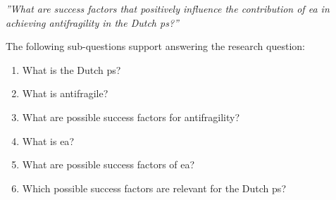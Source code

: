 \vspace{\baselineskip}
\noindent \emph{''What are success factors that positively influence the contribution of \acrlong{ea} in achieving \gls{antifragility} in the Dutch \gls{ps}?''}
\vspace{\baselineskip}

\noindent The following sub-questions support answering the research question:
\begin{enumerate}
	\item{What is the Dutch \gls{ps}?}
	\item{What is \gls{antifragile}?}
	\item{What are possible success factors for \gls{antifragility}?}
	\item{What is \acrlong{ea}?}
	\item{What are possible success factors of \acrlong{ea}?}
	\item{Which possible success factors are relevant for the Dutch \gls{ps}?}
\end{enumerate}
